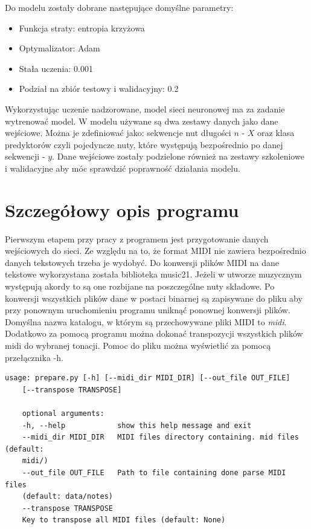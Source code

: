 	Do modelu zostały dobrane następujące domyślne parametry:
	
	\begin{itemize}
		\item Funkcja straty: entropia krzyżowa
		\item Optymalizator: Adam
		\item Stała uczenia: 0.001
		\item Podział na zbiór testowy i walidacyjny: 0.2
	\end{itemize}	
	
	Wykorzystując uczenie nadzorowane, model sieci neuronowej ma za zadanie wytrenować model. W modelu używane są dwa zestawy danych jako dane wejściowe. Można je zdefiniować jako: sekwencje nut długości $n$ - $X$ oraz klasa predyktorów czyli pojedyncze nuty, które występują bezpośrednio po danej sekwencji - $y$. Dane wejściowe zostały podzielone również na zestawy szkoleniowe i walidacyjne aby móc sprawdzić poprawność działania modelu. 
		
	\section{Szczegółowy opis programu}
	
	Pierwszym etapem przy pracy z programem jest przygotowanie danych wejściowych do sieci. Ze względu na to, że format MIDI nie zawiera bezpośrednio danych tekstowych trzeba je wydobyć. Do konwersji plików MIDI na dane tekstowe wykorzystana została biblioteka music21. Jeżeli w utworze muzycznym występują akordy to są one rozbijane na poszczególne nuty składowe. Po konwersji wszystkich plików dane w postaci binarnej są zapisywane do pliku aby przy ponownym uruchomieniu programu uniknąć ponownej konwersji plików. Domyślna nazwa katalogu, w którym są przechowywane pliki MIDI to \textit{midi}. Dodatkowo za pomocą programu można dokonać transpozycji wszystkich plików midi do wybranej tonacji. Pomoc do pliku można wyświetlić za pomocą przełącznika -h. 
	
	\begin{lstlisting}[caption={Pomoc do programu prepare.py},captionpos=b]
	usage: prepare.py [-h] [--midi_dir MIDI_DIR] [--out_file OUT_FILE]
	[--transpose TRANSPOSE]

	optional arguments:
	-h, --help            show this help message and exit
	--midi_dir MIDI_DIR   MIDI files directory containing. mid files (default:
	midi/)
	--out_file OUT_FILE   Path to file containing done parse MIDI files
	(default: data/notes)
	--transpose TRANSPOSE
	Key to transpose all MIDI files (default: None)
	
	\end{lstlisting}
	
